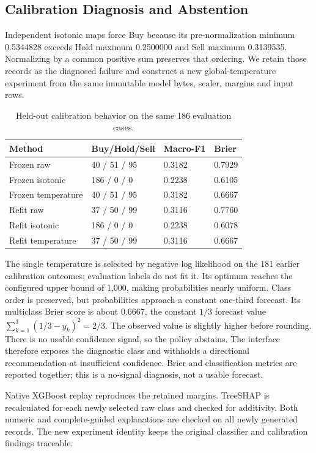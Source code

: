 \subsection{Calibration Diagnosis and Abstention}

Independent isotonic maps force Buy because its pre-normalization minimum 0.5344828 exceeds Hold maximum 0.2500000 and Sell maximum 0.3139535. Normalizing by a common positive sum preserves that ordering. We retain those records as the diagnosed failure and construct a new global-temperature experiment from the same immutable model bytes, scaler, margins and input rows.
\begin{longtable}{p{}p{}p{}p{}}
\caption{Held-out calibration behavior on the same 186 evaluation cases.}\label{tab:calibration-results}\\\toprule Method & Buy/Hold/Sell & Macro-F1 & Brier\\\midrule
Frozen raw & 40 / 51 / 95 & 0.3182 & 0.7929\\
Frozen isotonic & 186 / 0 / 0 & 0.2238 & 0.6105\\
Frozen temperature & 40 / 51 / 95 & 0.3182 & 0.6667\\
Refit raw & 37 / 50 / 99 & 0.3116 & 0.7760\\
Refit isotonic & 186 / 0 / 0 & 0.2238 & 0.6078\\
Refit temperature & 37 / 50 / 99 & 0.3116 & 0.6667\\
\bottomrule\end{longtable}
The single temperature is selected by negative log likelihood on the 181 earlier calibration outcomes; evaluation labels do not fit it. Its optimum reaches the configured upper bound of 1,000, making probabilities nearly uniform. Class order is preserved, but probabilities approach a constant one-third forecast. Its multiclass Brier score is about 0.6667, the constant $1/3$ forecast value $\sum_{k=1}^{3}(1/3-y_k)^2=2/3$. The observed value is slightly higher before rounding. There is no usable confidence signal, so the policy abstains. The interface therefore exposes the diagnostic class and withholds a directional recommendation at insufficient confidence. Brier and classification metrics are reported together; this is a no-signal diagnosis, not a usable forecast.

Native XGBoost replay reproduces the retained margins. TreeSHAP is recalculated for each newly selected raw class and checked for additivity. Both numeric and complete-guided explanations are checked on all newly generated records. The new experiment identity keeps the original classifier and calibration findings traceable.


